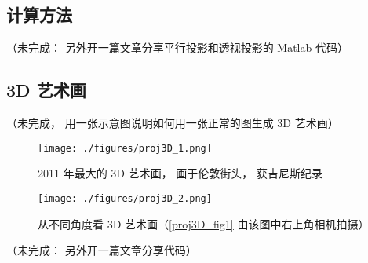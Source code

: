 \subsection{计算方法}
（未完成： 另外开一篇文章分享平行投影和透视投影的 Matlab 代码）

\subsection{3D 艺术画}
（未完成， 用一张示意图说明如何用一张正常的图生成 3D 艺术画）
\begin{figure}[ht]
\centering
\texttt{[image: ./figures/proj3D\_1.png]}
\caption{2011 年最大的 3D 艺术画， 画于伦敦街头， 获吉尼斯纪录} \label{proj3D_fig1}
\end{figure}

\begin{figure}[ht]
\centering
\texttt{[image: ./figures/proj3D\_2.png]}
\caption{从不同角度看 3D 艺术画（\autoref{proj3D_fig1} 由该图中右上角相机拍摄）} \label{proj3D_fig2}
\end{figure}

（未完成： 另外开一篇文章分享代码）

